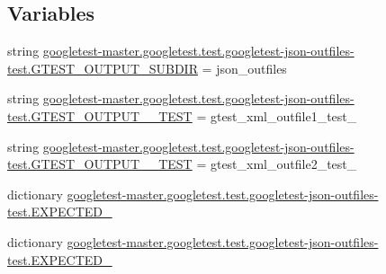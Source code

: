 \subsection*{Variables}
\begin{DoxyCompactItemize}
\item 
string \mbox{\hyperlink{namespacegoogletest-master_1_1googletest_1_1test_1_1googletest-json-outfiles-test_a10f4c8253cb86d1552a74efb44f3785a}{googletest-\/master.\+googletest.\+test.\+googletest-\/json-\/outfiles-\/test.\+G\+T\+E\+S\+T\+\_\+\+O\+U\+T\+P\+U\+T\+\_\+\+S\+U\+B\+D\+IR}} = \textquotesingle{}json\+\_\+outfiles\textquotesingle{}
\item 
string \mbox{\hyperlink{namespacegoogletest-master_1_1googletest_1_1test_1_1googletest-json-outfiles-test_a5de94923f2f695f36e5fc59c11a7d3b7}{googletest-\/master.\+googletest.\+test.\+googletest-\/json-\/outfiles-\/test.\+G\+T\+E\+S\+T\+\_\+\+O\+U\+T\+P\+U\+T\+\_\+\_\+\+T\+E\+ST}} = \textquotesingle{}gtest\+\_\+xml\+\_\+outfile1\+\_\+test\+\_\+\textquotesingle{}
\item 
string \mbox{\hyperlink{namespacegoogletest-master_1_1googletest_1_1test_1_1googletest-json-outfiles-test_a98cefe2abc94179eca328d3b99605593}{googletest-\/master.\+googletest.\+test.\+googletest-\/json-\/outfiles-\/test.\+G\+T\+E\+S\+T\+\_\+\+O\+U\+T\+P\+U\+T\+\_\+\_\+\+T\+E\+ST}} = \textquotesingle{}gtest\+\_\+xml\+\_\+outfile2\+\_\+test\+\_\+\textquotesingle{}
\item 
dictionary \mbox{\hyperlink{namespacegoogletest-master_1_1googletest_1_1test_1_1googletest-json-outfiles-test_afe1de3ccdd67016d5bb2b0a2172fa523}{googletest-\/master.\+googletest.\+test.\+googletest-\/json-\/outfiles-\/test.\+E\+X\+P\+E\+C\+T\+E\+D\+\_}}
\item 
dictionary \mbox{\hyperlink{namespacegoogletest-master_1_1googletest_1_1test_1_1googletest-json-outfiles-test_ac23e116c6b3f78f2af70a49111162ac8}{googletest-\/master.\+googletest.\+test.\+googletest-\/json-\/outfiles-\/test.\+E\+X\+P\+E\+C\+T\+E\+D\+\_}}
\end{DoxyCompactItemize}
